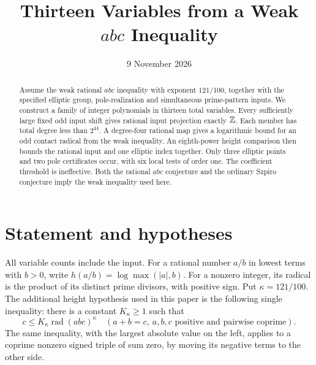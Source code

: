 \documentclass[11pt,a4paper]{article}
\title{Thirteen Variables from a Weak $abc$ Inequality}
\author{}\date{9 November 2026}
\begin{document}
\maketitle
\begin{abstract}
Assume the weak rational $abc$ inequality with exponent $121/100$,
together with the specified elliptic group, pole-realization and
simultaneous prime-pattern inputs. We construct a family of integer
polynomials in thirteen total variables. Every sufficiently large
fixed odd input shift gives rational input projection exactly $\mathbb Z$.
Each member has total degree less than $2^{44}$. A degree-four
rational map gives a logarithmic bound for an odd contact radical
from the weak inequality. An eighth-power height comparison then
bounds the rational input and one elliptic index together. Only
three elliptic points and two pole certificates occur, with six
local tests of order one. The coefficient threshold is ineffective.
Both the rational $abc$ conjecture and the ordinary Szpiro
conjecture imply the weak inequality used here.
\end{abstract}

\section{Statement and hypotheses}

All variable counts include the input. For a rational number $a/b$
in lowest terms with $b>0$, write
$h(a/b)=\log\max(|a|,b)$. For a nonzero integer, its radical
is the product of its distinct prime divisors, with positive sign.
Put $\kappa=121/100$. The additional height hypothesis used in this
paper is the following single inequality: there is a constant
$K_\kappa\ge1$ such that
\begin{equation}\label{eq:weak-abc}
 c\le K_\kappa\operatorname{rad}(abc)^{\kappa}
 \quad(a+b=c,\ a,b,c\text{ positive and pairwise coprime}).
\end{equation}
The same inequality, with the largest absolute value on the left,
applies to a coprime nonzero signed triple of sum zero, by moving
its negative terms to the other side.
\end{document}

